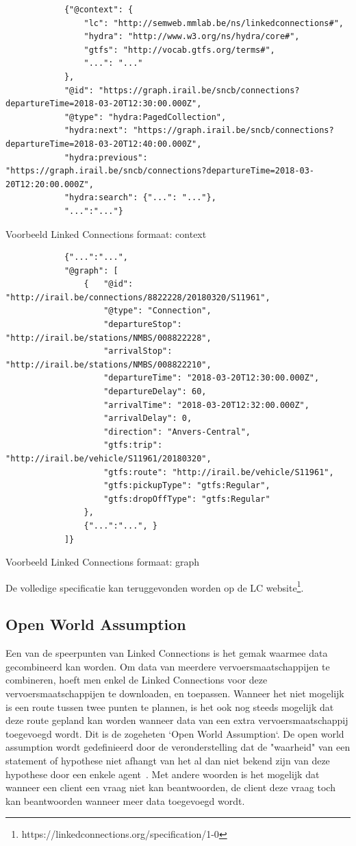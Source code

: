 \begin{listing}[h]
	\begin{verbatim}
			{"@context": {
			    "lc": "http://semweb.mmlab.be/ns/linkedconnections#",
			    "hydra": "http://www.w3.org/ns/hydra/core#",
			    "gtfs": "http://vocab.gtfs.org/terms#",
			    "...": "..."
			},
			"@id": "https://graph.irail.be/sncb/connections?departureTime=2018-03-20T12:30:00.000Z",
			"@type": "hydra:PagedCollection",
			"hydra:next": "https://graph.irail.be/sncb/connections?departureTime=2018-03-20T12:40:00.000Z",
			"hydra:previous": "https://graph.irail.be/sncb/connections?departureTime=2018-03-20T12:20:00.000Z",
			"hydra:search": {"...": "..."},
			"...":"..."}
		\end{verbatim}
	\caption{Voorbeeld Linked Connections formaat: context}
	\label{code:2:linkedconnections-response-context}
\end{listing}
\begin{listing}[h]
	\begin{verbatim}
			{"...":"...",
			"@graph": [
				{   "@id": "http://irail.be/connections/8822228/20180320/S11961",
				    "@type": "Connection",
    				"departureStop": "http://irail.be/stations/NMBS/008822228",
    				"arrivalStop": "http://irail.be/stations/NMBS/008822210",
    				"departureTime": "2018-03-20T12:30:00.000Z",
    				"departureDelay": 60,
    				"arrivalTime": "2018-03-20T12:32:00.000Z",
    				"arrivalDelay": 0,
    				"direction": "Anvers-Central",
    				"gtfs:trip": "http://irail.be/vehicle/S11961/20180320",
    				"gtfs:route": "http://irail.be/vehicle/S11961",
    				"gtfs:pickupType": "gtfs:Regular",
    				"gtfs:dropOffType": "gtfs:Regular"
				},
				{"...":"...", }
			]}
	\end{verbatim}
\caption{Voorbeeld Linked Connections formaat: graph}
\label{code:2:linkedconnections-response-graph}
\end{listing}
 
De volledige specificatie kan teruggevonden worden op de LC website\footnote{https://linkedconnections.org/specification/1-0}.
 
\subsection{Open World Assumption}
Een van de speerpunten van Linked Connections is het gemak waarmee data gecombineerd kan worden. Om data van meerdere vervoersmaatschappijen te combineren, hoeft men enkel de Linked Connections voor deze vervoersmaatschappijen te downloaden, en  toepassen. Wanneer het niet mogelijk is een route tussen twee punten te plannen, is het ook nog steeds mogelijk dat deze route gepland kan worden wanneer data van een extra vervoersmaatschappij toegevoegd wordt. Dit is de zogeheten `Open World Assumption`. De open world assumption wordt gedefinieerd door de veronderstelling dat de "waarheid" van een statement of hypothese niet afhangt van het al dan niet bekend zijn van deze hypothese door een enkele agent~\citep{Moore15}. Met andere woorden is het mogelijk dat wanneer een client een vraag niet kan beantwoorden, de client deze vraag toch kan beantwoorden wanneer meer data toegevoegd wordt.


